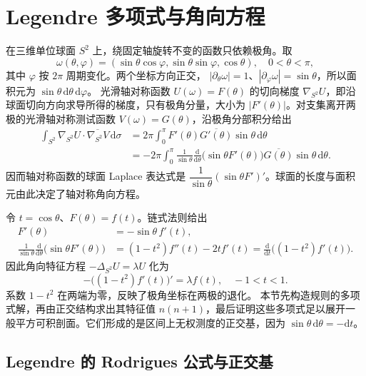 \section{Legendre 多项式与角向方程}
\label{b2:sec:B202}

在三维单位球面 \(S^2\) 上，绕固定轴旋转不变的函数只依赖极角。取
\[
 \omega(\theta,\varphi)
 =(\sin\theta\cos\varphi,\sin\theta\sin\varphi,\cos\theta),
 \quad 0<\theta<\pi,
\]
其中 \(\varphi\) 按 \(2\pi\) 周期变化。两个坐标方向正交，
\(|\partial_\theta\omega|=1\)、\(|\partial_\varphi\omega|=\sin\theta\)，所以面积元为
\(\sin\theta\,\mathrm d\theta\,\mathrm d\varphi\)。
光滑轴对称函数 \(U(\omega)=F(\theta)\) 的切向梯度
\(\nabla_{S^2}U\)，即沿球面切向方向求导所得的梯度，只有极角分量，大小为
\(|F'(\theta)|\)。对支集离开两极的光滑轴对称测试函数
\(V(\omega)=G(\theta)\)，沿极角分部积分给出
\[
\begin{aligned}
 \int_{S^2}\nabla_{S^2}U\cdot\overline{\nabla_{S^2}V}\,\mathrm d\sigma
 &=2\pi\int_0^\pi F'(\theta)\overline{G'(\theta)}
                       \sin\theta\,\mathrm d\theta\\
 &=-2\pi\int_0^\pi
    \frac1{\sin\theta}\frac{\mathrm d}{\mathrm d\theta}
        \bigl(\sin\theta F'(\theta)\bigr)
    \overline{G(\theta)}\sin\theta\,\mathrm d\theta.
\end{aligned}
\]
因而轴对称函数的球面 Laplace 表达式是
\(\dfrac1{\sin\theta}(\sin\theta F')'\)。球面的长度与面积元由此决定了轴对称角向方程。

\ProseParagraphBreak

令 \(t=\cos\theta\)、\(F(\theta)=f(t)\)。链式法则给出
\[
\begin{aligned}
 F'(\theta)&=-\sin\theta\,f'(t),\\
 \frac1{\sin\theta}\frac{\mathrm d}{\mathrm d\theta}
       \bigl(\sin\theta F'(\theta)\bigr)
 &=(1-t^2)f''(t)-2tf'(t)
 =\frac{\mathrm d}{\mathrm dt}\bigl((1-t^2)f'(t)\bigr).
\end{aligned}
\]
因此角向特征方程 \(-\Delta_{S^2}U=\lambda U\) 化为
\[
 -\bigl((1-t^2)f'(t)\bigr)'=\lambda f(t),
 \quad -1<t<1.
\]
系数 \(1-t^2\) 在两端为零，反映了极角坐标在两极的退化。
本节先构造规则的多项式解，再由正交结构求出其特征值
\(n(n+1)\)，最后证明这些多项式足以展开一般平方可积剖面。它们形成的是区间上无权测度的正交基，因为
\(\sin\theta\,\mathrm d\theta=-\mathrm dt\)。

\subsection{Legendre 的 Rodrigues 公式与正交基}
\label{b2:subsec:B20201}

